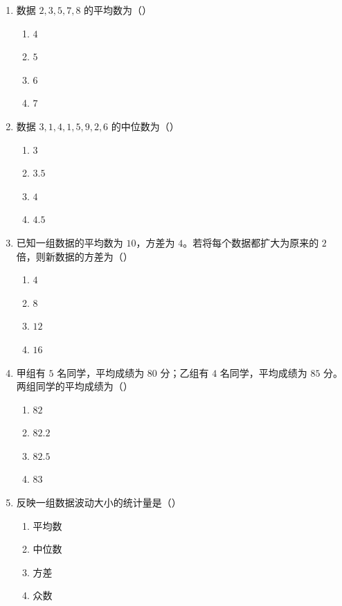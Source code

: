\documentclass[12pt, a4paper]{ctexart}
\begin{document}
\begin{enumerate}
\item 数据 $2,3,5,7,8$ 的平均数为（\quad）
  \begin{enumerate}[label=\Alph*., itemsep=0pt]
    \item $4$ \quad \item $5$ \quad \item $6$ \quad \item $7$
  \end{enumerate}

\item 数据 $3,1,4,1,5,9,2,6$ 的中位数为（\quad）
  \begin{enumerate}[label=\Alph*., itemsep=0pt]
    \item $3$ \quad \item $3.5$ \quad \item $4$ \quad \item $4.5$
  \end{enumerate}

\item 已知一组数据的平均数为 $10$，方差为 $4$。若将每个数据都扩大为原来的 $2$ 倍，则新数据的方差为（\quad）
  \begin{enumerate}[label=\Alph*., itemsep=0pt]
    \item $4$ \quad \item $8$ \quad \item $12$ \quad \item $16$
  \end{enumerate}

\item 甲组有 $5$ 名同学，平均成绩为 $80$ 分；乙组有 $4$ 名同学，平均成绩为 $85$ 分。两组同学的平均成绩为（\quad）
  \begin{enumerate}[label=\Alph*., itemsep=0pt]
    \item $82$ \quad \item $82.2$ \quad \item $82.5$ \quad \item $83$
  \end{enumerate}

\item 反映一组数据波动大小的统计量是（\quad）
  \begin{enumerate}[label=\Alph*., itemsep=0pt]
    \item 平均数 \quad \item 中位数 \quad \item 方差 \quad \item 众数
  \end{enumerate}


\end{enumerate}
\end{document}
